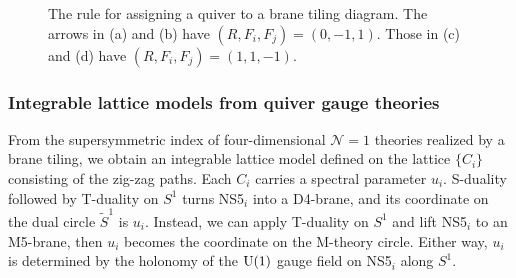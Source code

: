 \begin{figure}
{
    }
  \qquad
  \caption{The rule for assigning a quiver to a brane tiling diagram.
  The arrows in (a) and (b) have $(R, F_i, F_j)=(0, -1, 1)$. Those in
  (c) and (d) have $(R, F_i, F_j)=(1, 1, -1)$.}
  \label{fig:rule_for_quiver}
\end{figure}





\subsubsection{Integrable lattice models from quiver gauge theories}


From the supersymmetric index of four-dimensional $\mathcal{N}=1$
theories realized by a brane tiling, we obtain an integrable lattice
model defined on the lattice $\{ C_{i}\} $ consisting
of the zig-zag paths. Each $C_{i}$ carries a spectral parameter $u_{i}$.
S-duality followed by T-duality on $S^{1}$ turns NS5$_{i}$ into
a D4-brane, and its coordinate on the dual circle $\tilde{S}^{1}$
is $u_{i}$. Instead, we can apply T-duality on $S^{1}$ and lift
NS5$_{i}$ to an M5-brane, then $u_{i}$ becomes the coordinate on the
M-theory circle. Either way, $u_{i}$ is determined by the holonomy
of the $\mathrm{U}(1)$ gauge field on NS5$_{i}$ along $S^{1}$.

